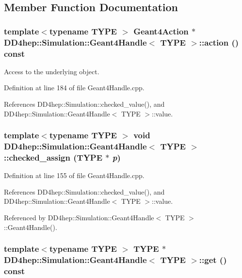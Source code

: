 \subsection{Member Function Documentation}
\hypertarget{class_d_d4hep_1_1_simulation_1_1_geant4_handle_a60a914f166e6a02fda749e519af8d4ab}{
\subsubsection[{action}]{\setlength{\rightskip}{0pt plus 5cm}template$<$typename TYPE $>$ {\bf Geant4Action} $\ast$ {\bf DD4hep::Simulation::Geant4Handle}$<$ TYPE $>$::action () const}}
\label{class_d_d4hep_1_1_simulation_1_1_geant4_handle_a60a914f166e6a02fda749e519af8d4ab}


Access to the underlying object. 

Definition at line 184 of file Geant4Handle.cpp.

References DD4hep::Simulation::checked\_\-value(), and DD4hep::Simulation::Geant4Handle$<$ TYPE $>$::value.\hypertarget{class_d_d4hep_1_1_simulation_1_1_geant4_handle_a8c1a9d7f4e2f0b7afee56e54e8e61ccf}{
\subsubsection[{checked\_\-assign}]{\setlength{\rightskip}{0pt plus 5cm}template$<$typename TYPE $>$ void {\bf DD4hep::Simulation::Geant4Handle}$<$ TYPE $>$::checked\_\-assign (TYPE $\ast$ {\em p})}}
\label{class_d_d4hep_1_1_simulation_1_1_geant4_handle_a8c1a9d7f4e2f0b7afee56e54e8e61ccf}


Definition at line 155 of file Geant4Handle.cpp.

References DD4hep::Simulation::checked\_\-value(), and DD4hep::Simulation::Geant4Handle$<$ TYPE $>$::value.

Referenced by DD4hep::Simulation::Geant4Handle$<$ TYPE $>$::Geant4Handle().\hypertarget{class_d_d4hep_1_1_simulation_1_1_geant4_handle_a4d91fe5a7397f397bbf2e066571a3b76}{
\subsubsection[{get}]{\setlength{\rightskip}{0pt plus 5cm}template$<$typename TYPE $>$ TYPE $\ast$ {\bf DD4hep::Simulation::Geant4Handle}$<$ TYPE $>$::get () const}}
\label{class_d_d4hep_1_1_simulation_1_1_geant4_handle_a4d91fe5a7397f397bbf2e066571a3b76}


